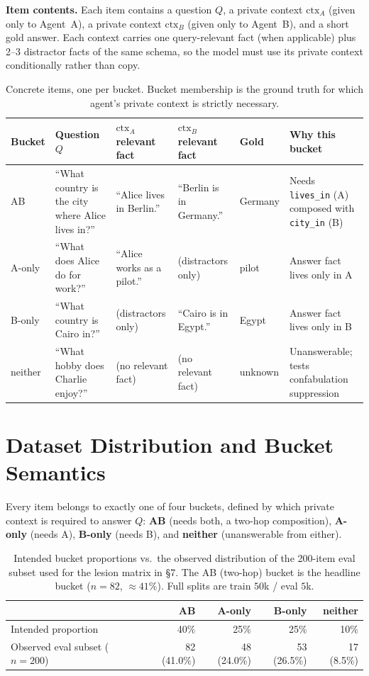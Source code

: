 \documentclass[10pt]{article}
\newcommand{\ctxa}{$\text{ctx}_A$}
\newcommand{\ctxb}{$\text{ctx}_B$}
\begin{document}
\noindent\textbf{Item contents.} Each item contains a question $Q$, a private context
\ctxa{} (given only to Agent~A), a private context \ctxb{} (given only to Agent~B), and a
short gold answer. Each context carries one query-relevant fact (when applicable) plus
2--3 distractor facts of the same schema, so the model must use its private context
conditionally rather than copy.

\begin{table}[H]
\centering
\footnotesize
\begin{tabular}{@{}p{1.0cm} p{3.1cm} p{2.7cm} p{2.7cm} p{1.2cm} p{3.2cm}@{}}
\toprule
\textbf{Bucket} & \textbf{Question $Q$} & \textbf{\ctxa{} relevant fact} & \textbf{\ctxb{} relevant fact} & \textbf{Gold} & \textbf{Why this bucket} \\
\midrule
AB        & ``What country is the city where Alice lives in?'' & ``Alice lives in Berlin.'' & ``Berlin is in Germany.'' & Germany & Needs \texttt{lives\_in} (A) composed with \texttt{city\_in} (B) \\
A-only    & ``What does Alice do for work?'' & ``Alice works as a pilot.'' & (distractors only) & pilot & Answer fact lives only in A \\
B-only    & ``What country is Cairo in?'' & (distractors only) & ``Cairo is in Egypt.'' & Egypt & Answer fact lives only in B \\
neither   & ``What hobby does Charlie enjoy?'' & (no relevant fact) & (no relevant fact) & unknown & Unanswerable; tests confabulation suppression \\
\bottomrule
\end{tabular}
\caption{Concrete items, one per bucket. Bucket membership is the ground truth for which
agent's private context is strictly necessary.}
\end{table}

\section{Dataset Distribution and Bucket Semantics}
Every item belongs to exactly one of four buckets, defined by which private context is
required to answer $Q$: \textbf{AB} (needs both, a two-hop composition), \textbf{A-only}
(needs A), \textbf{B-only} (needs B), and \textbf{neither} (unanswerable from either).

\begin{table}[H]
\centering
\small
\begin{tabular}{@{}l r r r r@{}}
\toprule
 & \textbf{AB} & \textbf{A-only} & \textbf{B-only} & \textbf{neither} \\
\midrule
Intended proportion          & 40\% & 25\%   & 25\%   & 10\%  \\
Observed eval subset ($n{=}200$) & 82 (41.0\%) & 48 (24.0\%) & 53 (26.5\%) & 17 (8.5\%) \\
\bottomrule
\end{tabular}
\caption{Intended bucket proportions vs.\ the observed distribution of the 200-item eval
subset used for the lesion matrix in \S7. The AB (two-hop) bucket is the headline bucket
($n{=}82$, ${\approx}41\%$). Full splits are train $50$k / eval $5$k.}
\end{table}
\end{document}
